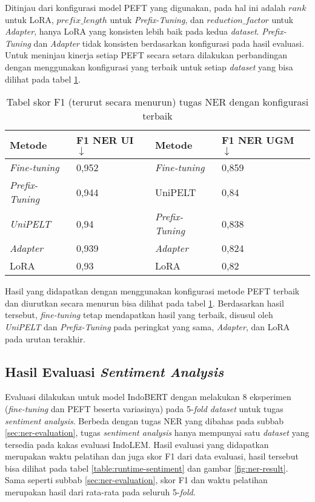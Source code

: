 Ditinjau dari konfigurasi model PEFT yang digunakan, pada hal ini adalah $rank$ untuk LoRA, $prefix\_length$ untuk \textit{Prefix-Tuning}, dan $reduction\_factor$ untuk \textit{Adapter}, hanya LoRA yang konsisten lebih baik pada kedua \textit{dataset}. \textit{Prefix-Tuning} dan \textit{Adapter} tidak konsisten berdasarkan konfigurasi pada hasil evaluasi. Untuk meninjau kinerja setiap PEFT secara setara dilakukan perbandingan dengan menggunakan konfigurasi yang terbaik untuk setiap \textit{dataset} yang bisa dilihat pada tabel \ref{table:ner-result-desc}.

\begin{table}[h]
    \centering
    \caption{Tabel skor F1 (terurut secara menurun) tugas NER dengan konfigurasi terbaik}
    \label{table:ner-result-desc}
    \begin{tabular}{ll|ll}
        \toprule
        \textbf{Metode} & \textbf{F1 NER UI $\downarrow$} & \textbf{Metode} & \textbf{F1 NER UGM $\downarrow$} \\
        \midrule
        \textit{Fine-tuning} & 0,952 & \textit{Fine-tuning} & 0,859 \\
        \textit{Prefix-Tuning} & 0,944 & UniPELT & 0,84 \\
        \textit{UniPELT} & 0,94 & \textit{Prefix-Tuning} & 0,838 \\
        \textit{Adapter} & 0,939 & \textit{Adapter} & 0,824 \\
        LoRA & 0,93 & LoRA & 0,82 \\
        \bottomrule
    \end{tabular}
\end{table}

Hasil yang didapatkan dengan menggunakan konfigurasi metode PEFT terbaik dan diurutkan secara menurun bisa dilihat pada tabel \ref{table:ner-result-desc}. Berdasarkan hasil tersebut, \textit{fine-tuning} tetap mendapatkan hasil yang terbaik, disusul oleh \textit{UniPELT} dan \textit{Prefix-Tuning} pada peringkat yang sama, \textit{Adapter}, dan LoRA pada urutan terakhir.

\subsection{Hasil Evaluasi \textit{Sentiment Analysis}}
\label{sec:sentiment-evaluation}

Evaluasi dilakukan untuk model IndoBERT dengan melakukan 8 eksperimen (\textit{fine-tuning} dan PEFT beserta variasinya) pada 5-\textit{fold dataset} untuk tugas \textit{sentiment analysis}. Berbeda dengan tugas NER yang dibahas pada subbab \ref{sec:ner-evaluation}, tugas \textit{sentiment analysis} hanya mempunyai satu \textit{dataset} yang tersedia pada kakas evaluasi IndoLEM. Hasil evaluasi yang didapatkan merupakan waktu pelatihan dan juga skor F1 dari data evaluasi, hasil tersebut bisa dilihat pada tabel \ref{table:runtime-sentiment} dan gambar \ref{fig:ner-result}. Sama seperti subbab \ref{sec:ner-evaluation}, skor F1 dan waktu pelatihan merupakan hasil dari rata-rata pada seluruh 5-\textit{fold}.

